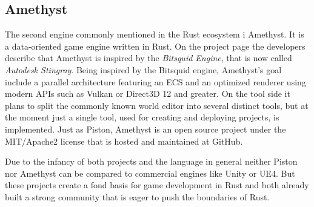 \subsection{Amethyst}

The second engine commonly mentioned in the Rust ecosystem i Amethyst. It is a data-oriented game engine written in Rust. On the project page the developers describe that Amethyst is inspired by the \textit{Bitsquid Engine}, that is now called \textit{Autodesk Stingray}. Being inspired by the Bitsquid engine, Amethyst's goal include a parallel architecture featuring an \ac{ECS} and an optimized renderer using modern \acp{API} such as Vulkan or Direct3D 12 and greater. On the tool side it plans to split the commonly known world editor into several distinct tools, but at the moment just a single tool, used for creating and deploying projects, is implemented. Just as Piston, Amethyst is an open source project under the MIT/Apache2 license that is hosted and maintained at GitHub. \cite{Amethyst}

Due to the infancy of both projects and the language in general neither Piston nor Amethyst can be compared to commercial engines like Unity or \ac{UE4}. But these projects create a fond basis for game development in Rust and both already built a strong community that is eager to push the boundaries of Rust.